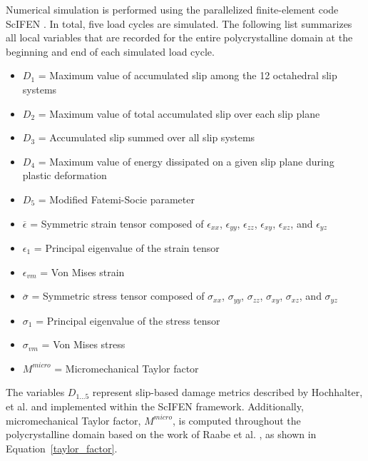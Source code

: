 Numerical simulation is performed using the parallelized finite-element code ScIFEN \cite{warner2016scalable}. In total, five load cycles are simulated. The following list summarizes all local variables that are recorded for the entire polycrystalline domain at the beginning and end of each simulated load cycle.

\begin{itemize}[noitemsep]
  \renewcommand\labelitemi{}
  \item $D_1$ \tabto{1.5cm} = \tabto{2cm} Maximum value of accumulated slip among the 12 octahedral slip systems 
  \item $D_2$ \tabto{1.5cm} = \tabto{2cm} Maximum value of total accumulated slip over each slip plane
  \item $D_3$ \tabto{1.5cm} = \tabto{2cm} Accumulated slip summed over all slip systems
  \item $D_4$ \tabto{1.5cm} = \tabto{2cm} Maximum value of energy dissipated on a given slip plane during plastic deformation
  \item $D_5$ \tabto{1.5cm} = \tabto{2cm} Modified Fatemi-Socie parameter
  \item $\overline{\epsilon}$ \tabto{1.5cm} = \tabto{2cm} Symmetric strain tensor composed of $\epsilon_{xx}$, $\epsilon_{yy}$, $\epsilon_{zz}$, $\epsilon_{xy}$, $\epsilon_{xz}$, and $\epsilon_{yz}$
  \item $\epsilon_{1}$ \tabto{1.5cm} = \tabto{2cm} Principal eigenvalue of the strain tensor
  \item $\epsilon_{vm}$ \tabto{1.5cm} = \tabto{2cm} Von Mises strain
  \item $\overline{\sigma}$ \tabto{1.5cm} = \tabto{2cm} Symmetric stress tensor composed of $\sigma_{xx}$, $\sigma_{yy}$, $\sigma_{zz}$, $\sigma_{xy}$, $\sigma_{xz}$, and $\sigma_{yz}$
  \item $\sigma_{1}$ \tabto{1.5cm} = \tabto{2cm} Principal eigenvalue of the stress tensor
  \item $\sigma_{vm}$ \tabto{1.5cm} = \tabto{2cm} Von Mises stress
  \item $M^{micro}$ \tabto{1.5cm} = \tabto{2cm} Micromechanical Taylor factor \cite{raabe2001}
\end{itemize}

The variables $D_{1...5}$ represent slip-based damage metrics described by Hochhalter, et al. \cite{hochhalter2010geometric} and implemented within the ScIFEN framework. Additionally, micromechanical Taylor factor, $M^{micro}$, is computed throughout the polycrystalline domain based on the work of Raabe et al. \cite{raabe2001}, as shown in Equation~\ref{taylor_factor}.

